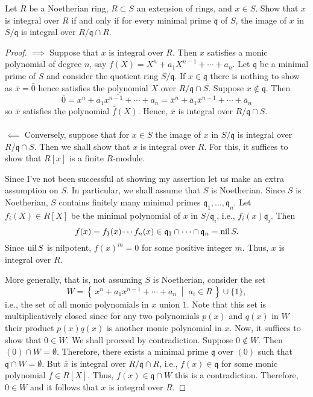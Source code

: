 \begin{problem}
Let $R$ be a Noetherian ring, $R\subset S$ an extension of rings,
and $x\in S$. Show that $x$ is integral over $R$ if and only if
for every minimal prime $\mathfrak{q}$ of $S$, the image of $x$
in $S/\mathfrak{q}$ is integral over $R/\mathfrak{q}\cap R$.
\end{problem}
\begin{proof}
$\implies$ Suppose that $x$ is integral over $R$. Then $x$ satisfies a
monic polynomial of degree $n$, say $f(X)=X^n+a_1X^{n-1}+\cdots+a_n$. Let
$\mathfrak{q}$ be a minimal prime of $S$ and consider the quotient ring
$S/\mathfrak{q}$. If $x\in\mathfrak{q}$ there is nothing to show as $\bar
x=\bar 0$ hence satisfies the polynomial $X$ over $R/\mathfrak{q}\cap
S$. Suppose $x\notin\mathfrak{q}$. Then
\[
\bar 0=\overline{x^n+a_1x^{n-1}+\cdots+a_n}
=\bar x^n+\bar a_1\bar x^{n-1}+\cdots+\bar a_n
\]
so $\bar x$ satisfies the polynomial $\bar f(X)$. Hence, $\bar x$ is
integral over $R/\mathfrak{q}\cap S$.
\\\\
$\impliedby$ Conversely, suppose that for $x\in S$ the image of $x$ in
$S/\mathfrak{q}$ is integral over $R/\mathfrak{q}\cap S$. Then we shall
show that $x$ is integral over $R$. For this, it suffices to show that
$R[x]$ is a finite $R$-module.

Since I've not been successful at showing my assertion let us make an extra
assumption on $S$. In particular, we shall assume that $S$ is
Noetherian. Since $S$ is Noetherian, $S$ contains finitely many minimal
primes $\mathfrak{q}_1,...,\mathfrak{q}_n$. Let $f_i(X)\in R[X]$ be the
minimal polynomial of $x$ in $S/\mathfrak{q}_i$, i.e.,
$f_i(x)\mathfrak{q}_i$. Then
\[
f(x)=f_1(x)\cdots f_n(x)\in\mathfrak{q}_1\cap\cdots\cap\mathfrak{q}_n=\operatorname{nil} S.
\]
Since $\operatorname{nil} S$ is nilpotent, $f(x)^m=0$ for some positive integer
$m$. Thus, $x$ is integral over $R$.

More generally, that is, not assuming $S$ is Noetherian, consider the set
\[
W=\left\{\,x^n+a_1x^{n-1}+\cdots+a_n\;\middle|\;a_i\in R\,\right\}\cup\{1\},
\]
i.e., the set of all monic polynomials in $x$ union $1$. Note that this set
is multiplicatively closed since for any two polynomials $p(x)$ and $q(x)$
in $W$ their product $p(x)q(x)$ is another monic polynomial in $x$. Now, it
suffices to show that $0\in W$. We shall proceed by contradiction. Suppose
$0\notin W$. Then $(0)\cap W=\emptyset$. Therefore, there exists a minimal
prime $\mathfrak{q}$ over $(0)$ such that $\mathfrak{q}\cap
W=\emptyset$. But $\bar x$ is integral over $R/\mathfrak{q}\cap R$, i.e.,
$f(x)\in\mathfrak{q}$ for some monic polynomial $f\in R[X]$. Thus,
$f(x)\in\mathfrak{q}\cap W$ this is a contradiction. Therefore, $0\in W$
and it follows that $x$ is integral over $R$.
\end{proof}
